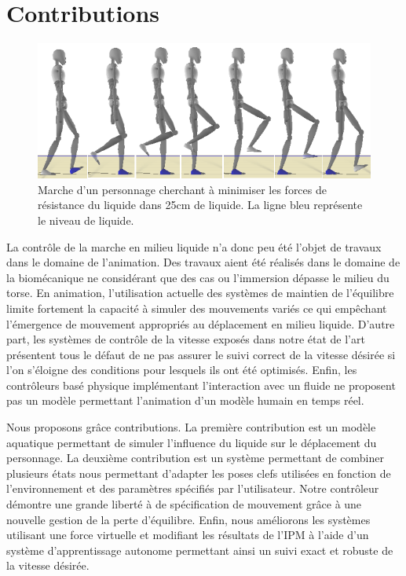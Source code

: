 \documentclass[runningheads,a4paper]{llncs}
\begin{document}
\section{Contributions}
\label{sec:overview}


\begin{figure}[h]
\centering
\includegraphics[scale=0.6]{strips/min_drag_25cm.png}
\caption{Marche d'un personnage cherchant à minimiser les forces de résistance du liquide dans 25cm de liquide. La ligne bleu représente le niveau de liquide.}
\label{fig:min_drag_25}
\end{figure}


La contrôle de la marche en milieu liquide n'a donc peu été l'objet de travaux dans le domaine de l'animation.  Des travaux aient été réalisés dans le domaine de la biomécanique ne considérant que des cas ou l'immersion dépasse le milieu du torse. En animation, l'utilisation actuelle des systèmes de maintien de l'équilibre limite fortement la capacité à simuler des mouvements variés ce qui empêchant l'émergence de mouvement appropriés au déplacement en milieu liquide. D'autre part, les systèmes de contrôle de la vitesse exposés dans notre état de l'art présentent tous  le défaut de ne pas assurer le suivi correct de la vitesse désirée si l'on s'éloigne des conditions pour lesquels ils ont été optimisés. Enfin, les contrôleurs basé physique implémentant l'interaction avec un fluide ne proposent pas un modèle permettant l'animation d'un modèle humain en temps réel.

Nous proposons grâce contributions. La première contribution est un modèle aquatique permettant de simuler l'influence du liquide sur le déplacement du personnage. La deuxième contribution est un système permettant de combiner plusieurs états nous permettant d'adapter les poses clefs utilisées en fonction de l'environnement et des paramètres spécifiés par l'utilisateur. Notre contrôleur démontre une grande liberté à de spécification de mouvement grâce à une nouvelle gestion de la perte d'équilibre. Enfin, nous améliorons les systèmes utilisant une force virtuelle et modifiant les résultats de l'IPM à l'aide d'un système d'apprentissage autonome permettant ainsi un suivi exact et robuste de la vitesse désirée. 
\end{document}
